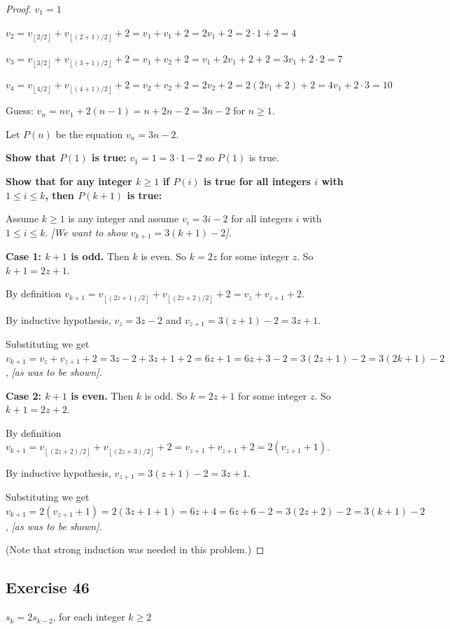 \documentclass[14pt]{extarticle}
\newcommand{\dps}{\displaystyle}
\newcommand{\floor}[1]{{\left\lfloor#1\right\rfloor}}
\begin{document}
\begin{proof}
\(v_1 = 1\)

\(\dps v_2 = v_{\floor{2/2}} + v_{\floor{(2+1)/2}} + 2 = v_1 + v_1 + 2 = 2v_1 + 2 = 2 \cdot 1 + 2 = 4\)

\(\dps v_3 = v_{\floor{3/2}} + v_{\floor{(3+1)/2}} + 2 = v_1 + v_2 + 2 = v_1 + 2v_1 + 2 + 2 = 3v_1 + 2 \cdot 2 = 7\)

\(\dps v_4 = v_{\floor{4/2}} + v_{\floor{(4+1)/2}} + 2 = v_2 + v_2 + 2 = 2v_2 + 2 = 2(2v_1 + 2) + 2 = 4v_1 + 2 \cdot 3 = 10\)

Guess: \(v_n = nv_1 + 2(n-1) = n + 2n - 2 = 3n - 2\) for \(n \geq 1\).

Let \(P(n)\) be the equation \(v_n = 3n-2\).

{\bf Show that $P(1)$ is true:} \(v_1 = 1 = 3 \cdot 1 - 2\) so $P(1)$ is true.

{\bf Show that for any integer \(k \geq 1\) if $P(i)$ is true for all integers $i$ with \(1 \leq i \leq k\), then
$P(k+1)$ is true:}

Assume \(k \geq 1\) is any integer and assume \(v_i = 3i-2\) for all integers $i$ with \(1 \leq i \leq k\).
{\it [We want to show \(v_{k+1} = 3(k+1) - 2\)].}

{\bf Case 1: $k+1$ is odd.} Then $k$ is even. So $k = 2z$ for some integer $z$. So $k+1 = 2z+1$.

By definition \(v_{k+1} = v_{\floor{(2z+1)/2}} + v_{\floor{(2z+2)/2}} + 2 = v_z + v_{z+1} + 2\).

By inductive hypothesis, \(v_z = 3z - 2\) and \(v_{z+1} = 3(z+1) - 2 = 3z+1\).

Substituting we get \(v_{k+1} = v_z + v_{z+1} + 2 = 3z-2 + 3z+1 + 2 = 6z + 1 = 6z+3 - 2 = 3(2z+1) - 2 = 3(2k+1) - 2\),
{\it [as was to be shown].}

{\bf Case 2: $k+1$ is even.} Then $k$ is odd. So $k = 2z+1$ for some integer $z$. So $k+1 = 2z+2$.

By definition \(v_{k+1} = v_{\floor{(2z+2)/2}} + v_{\floor{(2z+3)/2}} + 2 = v_{z+1} + v_{z+1} + 2 = 2(v_{z+1} + 1)\).

By inductive hypothesis, \(v_{z+1} = 3(z+1) - 2 = 3z+1\).

Substituting we get \(v_{k+1} = 2(v_{z+1} + 1) = 2(3z+1 + 1) = 6z + 4 = 6z + 6 - 2 = 3(2z + 2) - 2 = 3(k+1) - 2\),
{\it [as was to be shown].}

(Note that strong induction was needed in this problem.)
\end{proof}

\subsection{Exercise 46}
\(s_k = 2s_{k-2}\), for each integer \(k \geq 2\)
\end{document}
